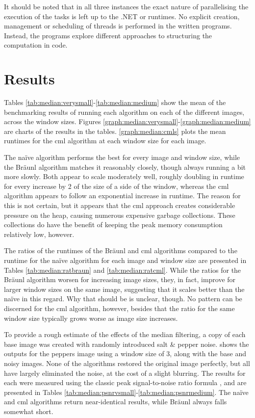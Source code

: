It should be noted that in all three instances the exact nature of parallelising the execution of the tasks is left up to the .NET or \hopac{} runtimes.  No explicit creation, management or scheduling of threads is performed in the written programs.  Instead, the programs explore different approaches to structuring the computation in code.

\section{Results}
Tables \ref{tab:median:verysmall}-\ref{tab:median:medium} show the mean of the benchmarking results of running each algorithm on each of the different images, across the window sizes.  Figures \ref{graph:median:verysmall}-\ref{graph:median:medium} are charts of the results in the tables.  \cref{graph:median:cmls} plots the mean runtimes for the \gls{cml} algorithm at each window size for each image. 

The naïve algorithm performs the best for every image and window size, while the Bräunl algorithm matches it reasonably closely, though always running a bit more slowly.  Both appear to scale moderately well, roughly doubling in runtime for every increase by 2 of the size of a side of the window, whereas the \gls{cml} algorithm appears to follow an exponential increase in runtime.  The reason for this is not certain, but it appears that the \gls{cml} approach creates considerable pressure on the heap, causing numerous expensive garbage collections.  These collections do have the benefit of keeping the peak memory consumption relatively low, however.

The ratios of the runtimes of the Bräunl and \gls{cml} algorithms compared to the runtime for the naïve algorithm for each image and window size are presented in Tables \ref{tab:median:ratbraun} and \ref{tab:median:ratcml}.  While the ratios for the Bräunl algorithm worsen for increasing image sizes, they, in fact, improve for larger window sizes on the same image, suggesting that it scales better than the naïve in this regard.  Why that should be is unclear, though.  No pattern can be discerned for the \gls{cml} algorithm, however, besides that the ratio for the same window size typically grows worse as image size increases.

To provide a rough estimate of the effects of the median filtering, a copy of each base image was created with randomly introduced salt \& pepper noise.   shows the outputs for the peppers image using a window size of 3, along with the base and noisy images.  None of the algorithms restored the original image perfectly, but all have largely eliminated the noise, at the cost of a slight blurring.  The results for each were measured using the classic peak signal-to-noise ratio formula \cite{Boncelet2005}, and are presented in Tables \ref{tab:median:psnrvsmall}-\ref{tab:median:psnrmedium}.  The naïve and \gls{cml} algorithms return near-identical results, while Bräunl always falls somewhat short.

